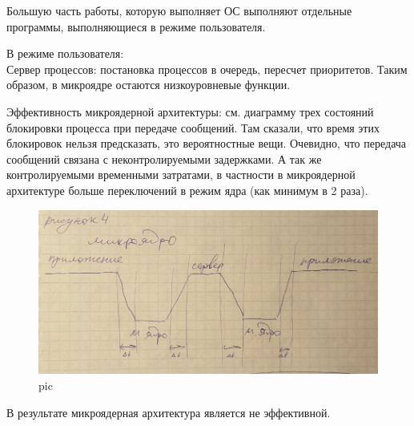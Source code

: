 Большую часть работы, которую выполняет ОС выполняют отдельные программы, выполняющиеся в режиме пользователя.

В режиме пользователя:\\
Сервер процессов: постановка процессов в очередь, пересчет приоритетов.
Таким образом, в микроядре остаются низкоуровневые функции. 

Эффективность микроядерной архитектуры:
см. диаграмму трех состояний блокировки процесса при передаче сообщений. Там сказали, что время этих блокировок нельзя предсказать, это вероятностные вещи. Очевидно, что передача сообщений связана с неконтролируемыми задержками. А так же контролируемыми временными затратами, в частности в микроядерной архитектуре больше переключений в режим ядра (как минимум в 2 раза).

\begin{figure}[H]
    \centering
    \includegraphics[width=\textwidth]{pic/6.png}
    \caption{pic}
\end{figure}

В результате микроядерная архитектура является не эффективной.